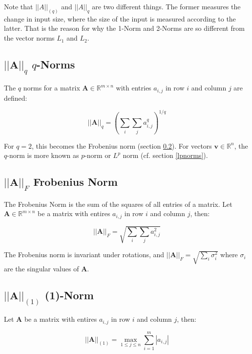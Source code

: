 Note that $||A||_{(q)}$ and $||A||_q$ are two different things. The former measures the change in input size, where the size of the input is measured according to the latter. That is the reason for why the 1-Norm and 2-Norms are so different from the vector norms $L_1$ and $L_2$.


\subsection{$||\mathbf{A}||_q$ $q$-Norms}
\label{qnorms}

The $q$ norms for a matrix $\mathbf{A} \in \mathbb{R}^{m\times n}$ with entries $a_{i,j}$ in row $i$ and column $j$ are defined:

\begin{equation}
||\mathbf{A}||_q = \left(\sum_{i}\sum_{j} a^q_{i,j}\right)^{1/q}
\end{equation}

For $q=2$, this becomes the Frobenius norm (section \ref{frobenius}). For vectors $\mathbf{v}\in\mathbb{R}^{n}$, the $q$-norm is more known as $p$-norm or $L^p$ norm (cf. section \ref{lpnorms}). 

\subsection{$||\mathbf{A}||_F$ Frobenius Norm}
\label{frobenius}
The Frobenius Norm is the sum of the squares of all entries of a matrix. Let $\mathbf{A} \in \mathbb{R}^{m\times n}$ be a matrix with entires $a_{i,j}$ in row $i$ and column $j$, then:

\begin{equation}
||\mathbf{A}||_F = \sqrt{\sum_{i}\sum_{j} a^2_{i,j}}
\end{equation}

The Frobenius norm is invariant under rotations, and $||\mathbf{A}||_F = \sqrt{\sum_i \sigma_i^2}$ where $\sigma_i$ are the singular values of $\mathbf{A}$. 

\subsection{$||\mathbf{A}||_{(1)}$ (1)-Norm}
Let $\mathbf{A}$ be a matrix with entires $a_{i,j}$ in row $i$ and column $j$, then:

\begin{equation}
||\mathbf{A}||_{(1)} = \max_{1\leq j \leq n} \sum^m_{i=1} |a_{i,j} |
\end{equation}

